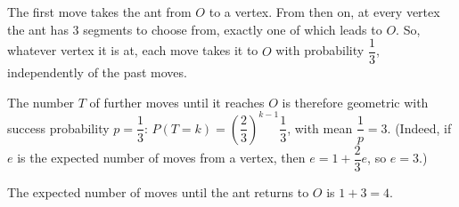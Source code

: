 The first move takes the ant from $O$ to a vertex. From then on, at every vertex the ant has $3$ segments to choose from, exactly one of which leads to $O$. So, whatever vertex it is at, each move takes it to $O$ with probability $\dfrac13$, independently of the past moves.

The number $T$ of further moves until it reaches $O$ is therefore geometric with success probability $p=\dfrac13$: $P(T=k)=\left(\dfrac23\right)^{k-1}\dfrac13$, with mean $\dfrac1p=3$. (Indeed, if $e$ is the expected number of moves from a vertex, then $e=1+\dfrac23e$, so $e=3$.)

The expected number of moves until the ant returns to $O$ is $1+3=\boxed{4}$.
